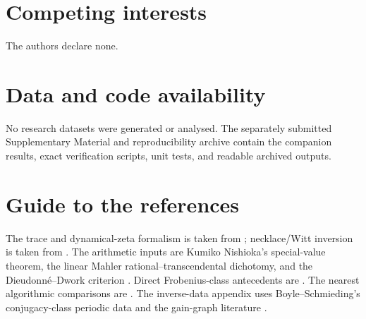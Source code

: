\documentclass[11pt,a4paper]{amsart}
\theoremstyle{plain}
\theoremstyle{definition}
\theoremstyle{remark}
\begin{document}

\maketitle
\enlargethispage{4pt}







\appendix



\section*{Competing interests}
The authors declare none.

\section*{Data and code availability}
No research datasets were generated or analysed. The separately submitted
Supplementary Material and reproducibility archive contain the companion
results, exact verification scripts, unit tests, and readable archived
outputs.

\section*{Guide to the references}
The trace and dynamical-zeta formalism is taken from
\cite{BowenLanford1970Zeta,ParryPollicott1990Zeta}; necklace/Witt inversion
is taken from \cite{MetropolisRota1983Necklaces}.  The arithmetic inputs are
Kumiko Nishioka's special-value theorem, the linear Mahler
rational--transcendental dichotomy, and the Dieudonn\'e--Dwork criterion
\cite{Nishioka1982MahlerFunctionValues,Nishioka1996MahlerFunctions,
BellCoonsRowland2013MahlerDichotomy,PomeratStraub2024RootsPowerSeries}.
Direct Frobenius-class antecedents are
\cite{ParryPollicott1986Chebotarev,NooraniParry1992ChebotarevShifts,
MeslizaNoorani1999FrobeniusMertens,Noorani2003ClosedOrbitsToral}.
The nearest algorithmic comparisons are
\cite{ChyzakDreyfusDumasMezzarobba2018MahlerSolutions,
ChyzakDreyfusDumasMezzarobba2025FirstOrderFactors}.  The inverse-data
appendix uses Boyle--Schmieding's conjugacy-class periodic data and the
gain-graph literature
\cite{BoyleSchmieding2017FiniteGroupExtensions,
CavaleriDAngeliDonno2021BalanceGainGraphs,CavaleriDonno2022Cospectrality,
AbiadBelardoKhramova2024Switching,Zaslavsky1989BiasedGraphs,
GrossTucker1987TopologicalGraphTheory}.



\end{document}
